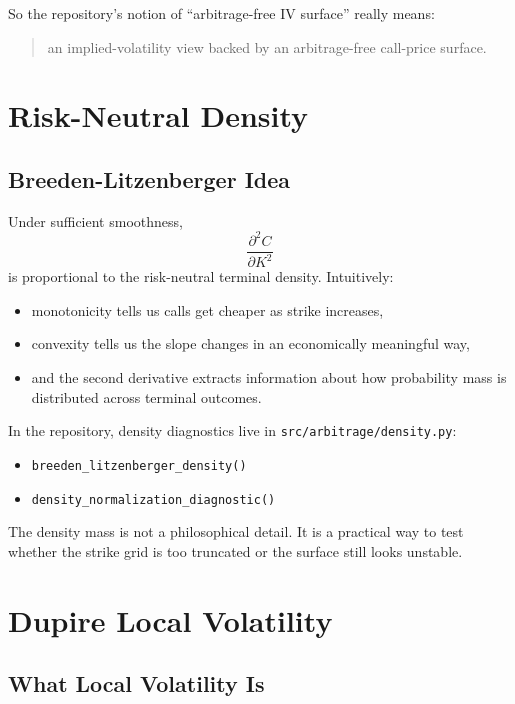 \documentclass[11pt]{article}
\begin{document}
So the repository's notion of ``arbitrage-free IV surface'' really means:

\begin{quote}
an implied-volatility view backed by an arbitrage-free call-price surface.
\end{quote}

\section{Risk-Neutral Density}

\subsection{Breeden-Litzenberger Idea}

Under sufficient smoothness,
\[
\frac{\partial^2 C}{\partial K^2}
\]
is proportional to the risk-neutral terminal density. Intuitively:

\begin{itemize}
  \item monotonicity tells us calls get cheaper as strike increases,
  \item convexity tells us the slope changes in an economically meaningful way,
  \item and the second derivative extracts information about how probability mass is distributed across terminal outcomes.
\end{itemize}

In the repository, density diagnostics live in \texttt{src/arbitrage/density.py}:

\begin{itemize}
  \item \texttt{breeden\_litzenberger\_density()}
  \item \texttt{density\_normalization\_diagnostic()}
\end{itemize}

The density mass is not a philosophical detail. It is a practical way to test whether the strike grid is too truncated or the surface still looks unstable.

\section{Dupire Local Volatility}

\subsection{What Local Volatility Is}
\end{document}
